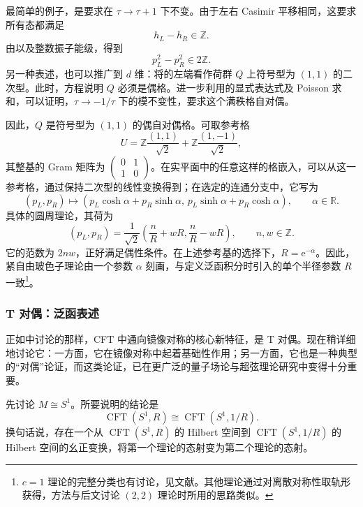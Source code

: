 最简单的例子，是要求在 $\tau\to\tau+1$ 下不变。由于左右 Casimir 平移相同，这要求所有态都满足
\[
h_L-h_R\in\mathbb{Z}.
\]
由以及整数振子能级，得到
\begin{equation}\label{eq:3.57}
p_L^2-p_R^2\in2\mathbb{Z}.
\end{equation}
另一种表述，也可以推广到 $d$ 维：将的左端看作荷群 $Q$ 上符号型为 $(1,1)$ 的二次型。此时，方程说明 $Q$ 必须是偶格。进一步利用的显式表达式及 Poisson 求和，可以证明，$\tau\to-1/\tau$ 下的模不变性，要求这个满秩格自对偶。

因此，$Q$ 是符号型为 $(1,1)$ 的偶自对偶格。可取参考格
\[
U=\mathbb{Z}\frac{(1,1)}{\sqrt2}
+\mathbb{Z}\frac{(1,-1)}{\sqrt2},
\]
其整基的 Gram 矩阵为 $\left(\begin{smallmatrix}0&1\\1&0\end{smallmatrix}\right)$。在实平面中的任意这样的格嵌入，可以从这一参考格，通过保持二次型的线性变换得到；在选定的连通分支中，它写为
\[
(p_L,p_R)\longmapsto
(p_L\cosh\alpha+p_R\sinh\alpha,\,
p_L\sinh\alpha+p_R\cosh\alpha),
\qquad\alpha\in\mathbb{R}.
\]
具体的圆周理论，其荷为
\[
(p_L,p_R)=\frac1{\sqrt2}
\left(\frac nR+wR,\frac nR-wR\right),
\qquad n,w\in\mathbb{Z}.
\]
它的范数为 $2nw$，正好满足偶性条件。在上述参考基的选择下，$R=\mathrm{e}^{-\alpha}$。因此，紧自由玻色子理论由一个参数 $\alpha$ 刻画，与定义泛函积分时引入的单个半径参数 $R$ 一致\footnote{$c=1$ 理论的完整分类也有讨论，见文献。其他理论通过对离散对称性取轨形获得，方法与后文讨论 $(2,2)$ 理论时所用的思路类似。}。

\enlargethispage{0.5pt}
\subsubsection{T 对偶：泛函表述}\label{sec:3.2.3.6}

正如中讨论的那样，CFT 中通向镜像对称的核心新特征，是 T 对偶。现在稍详细地讨论它：一方面，它在镜像对称中起着基础性作用；另一方面，它也是一种典型的“对偶”论证，而这类论证，已在更广泛的量子场论与超弦理论研究中变得十分重要。

先讨论 $M\cong S^1$。所要说明的结论是
\begin{equation}\label{eq:3.58}
\operatorname{CFT}(S^1,R)\cong\operatorname{CFT}(S^1,1/R).
\end{equation}
换句话说，存在一个从 $\operatorname{CFT}(S^1,R)$ 的 Hilbert 空间到 $\operatorname{CFT}(S^1,1/R)$ 的 Hilbert 空间的幺正变换，将第一个理论的态射变为第二个理论的态射。

